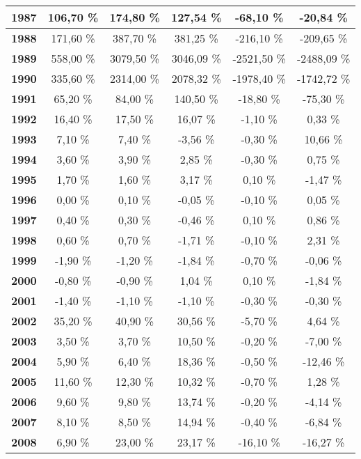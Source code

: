 \begin{center}
\begin{footnotesize}
\begin{longtable}{|c|c|c|c|c|c|}
\textbf{1987} & 106,70 \% & 174,80 \% & 127,54 \% & -68,10 \% & -20,84 \% \\ \hline
\textbf{1988} & 171,60 \% & 387,70 \% & 381,25 \% & -216,10 \% & -209,65 \% \\ \hline
\textbf{1989} & 558,00 \% & 3079,50 \% & 3046,09 \% & -2521,50 \% & -2488,09 \% \\ \hline
\textbf{1990} & 335,60 \% & 2314,00 \% & 2078,32 \% & -1978,40 \% & -1742,72 \% \\ \hline
\textbf{1991} & 65,20 \% & 84,00 \% & 140,50 \% & -18,80 \% & -75,30 \% \\ \hline
\textbf{1992} & 16,40 \% & 17,50 \% & 16,07 \% & -1,10 \% & 0,33 \% \\ \hline
\textbf{1993} & 7,10 \% & 7,40 \% & -3,56 \% & -0,30 \% & 10,66 \% \\ \hline
\textbf{1994} & 3,60 \% & 3,90 \% & 2,85 \% & -0,30 \% & 0,75 \% \\ \hline
\textbf{1995} & 1,70 \% & 1,60 \% & 3,17 \% & 0,10 \% & -1,47 \% \\ \hline
\textbf{1996} & 0,00 \% & 0,10 \% & -0,05 \% & -0,10 \% & 0,05 \% \\ \hline
\textbf{1997} & 0,40 \% & 0,30 \% & -0,46 \% & 0,10 \% & 0,86 \% \\ \hline
\textbf{1998} & 0,60 \% & 0,70 \% & -1,71 \% & -0,10 \% & 2,31 \% \\ \hline
\textbf{1999} & -1,90 \% & -1,20 \% & -1,84 \% & -0,70 \% & -0,06 \% \\ \hline
\textbf{2000} & -0,80 \% & -0,90 \% & 1,04 \% & 0,10 \% & -1,84 \% \\ \hline
\textbf{2001} & -1,40 \% & -1,10 \% & -1,10 \% & -0,30 \% & -0,30 \% \\ \hline
\textbf{2002} & 35,20 \% & 40,90 \% & 30,56 \% & -5,70 \% & 4,64 \% \\ \hline
\textbf{2003} & 3,50 \% & 3,70 \% & 10,50 \% & -0,20 \% & -7,00 \% \\ \hline
\textbf{2004} & 5,90 \% & 6,40 \% & 18,36 \% & -0,50 \% & -12,46 \% \\ \hline
\textbf{2005} & 11,60 \% & 12,30 \% & 10,32 \% & -0,70 \% & 1,28 \% \\ \hline
\textbf{2006} & 9,60 \% & 9,80 \% & 13,74 \% & -0,20 \% & -4,14 \% \\ \hline
\textbf{2007} & 8,10 \% & 8,50 \% & 14,94 \% & -0,40 \% & -6,84 \% \\ \hline
\textbf{2008} & 6,90 \% & 23,00 \% & 23,17 \% & -16,10 \% & -16,27 \% \\ \hline

\end{longtable}
\end{footnotesize}
\end{center}
